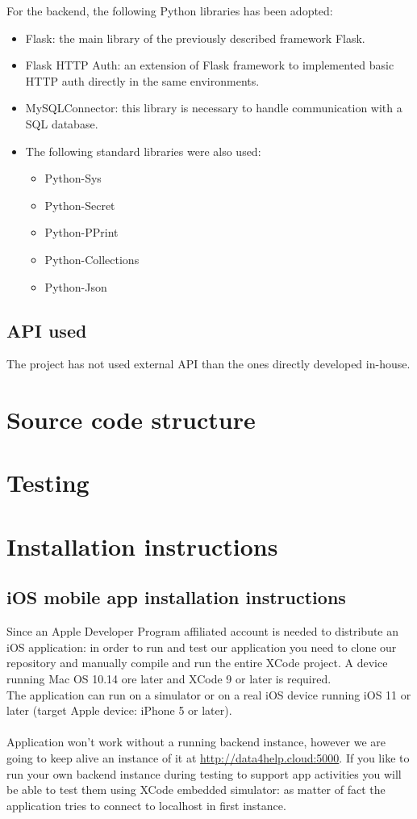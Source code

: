 \documentclass{article}
\begin{document}
For the backend, the following Python libraries has been adopted:
\begin{itemize}
	\item Flask: the main library of the previously described framework Flask.
	\item Flask HTTP Auth: an extension of Flask framework to implemented basic HTTP auth directly in the same environments.
	\item MySQLConnector: this library is necessary to handle communication with a SQL database.
	\item The following standard libraries were also used:
			\begin{itemize}
				\item Python-Sys
				\item Python-Secret
				\item Python-PPrint
				\item Python-Collections
				\item Python-Json
			\end{itemize}
\end{itemize}



\subsection{API used}
The project has not used external API than the ones directly developed in-house.

\section{Source code structure}

\section{Testing}

\section{Installation instructions}

\subsection{iOS mobile app installation instructions}
Since an Apple Developer Program affiliated account is needed to distribute an iOS application: in order to run and test our application you need to clone our repository and manually compile and run the entire XCode project. A device running Mac OS 10.14 ore later and XCode 9 or later is required. \\
	The application can run on a simulator or on a real iOS device running iOS 11 or later (target Apple device: iPhone 5 or later).	\\\\
	Application won't work without a running backend instance, however we are going to keep alive an instance of it at \url{http://data4help.cloud:5000}.
	If you like to run your own backend instance during testing to support app activities you will be able to test them using XCode embedded simulator: as matter of fact the application tries to connect to localhost in first instance.
\end{document}
